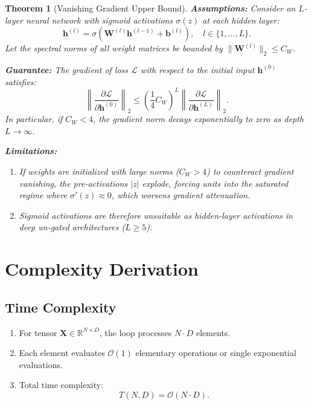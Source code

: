\documentclass[11pt]{article}
\newtheorem{theorem}{Theorem}
\begin{document}
\begin{theorem}[Vanishing Gradient Upper Bound]
\label{thm:vanishing_grad}
\textbf{Assumptions:}
Consider an $L$-layer neural network with sigmoid activations $\sigma(z)$ at each hidden layer:
\begin{equation}
\mathbf{h}^{(l)} = \sigma(\mathbf{W}^{(l)} \mathbf{h}^{(l-1)} + \mathbf{b}^{(l)}), \quad l \in \{1, \dots, L\}.
\end{equation}
Let the spectral norms of all weight matrices be bounded by $\|\mathbf{W}^{(l)}\|_2 \le C_W$.

\textbf{Guarantee:}
The gradient of loss $\mathcal{L}$ with respect to the initial input $\mathbf{h}^{(0)}$ satisfies:
\begin{equation}
\label{eq:vanishing_bound}
\left\| \frac{\partial \mathcal{L}}{\partial \mathbf{h}^{(0)}} \right\|_2 \le \left( \frac{1}{4} C_W \right)^L \left\| \frac{\partial \mathcal{L}}{\partial \mathbf{h}^{(L)}} \right\|_2.
\end{equation}
In particular, if $C_W < 4$, the gradient norm decays exponentially to zero as depth $L \to \infty$.

\textbf{Limitations:}
\begin{enumerate}
    \item If weights are initialized with large norms ($C_W > 4$) to counteract gradient vanishing, the pre-activations $|z|$ explode, forcing units into the saturated regime where $\sigma'(z) \approx 0$, which worsens gradient attenuation.
    \item Sigmoid activations are therefore unsuitable as hidden-layer activations in deep un-gated architectures ($L \ge 5$).
\end{enumerate}
\end{theorem}

\section{Complexity Derivation}
\label{sec:complexity}

\subsection{Time Complexity}
\begin{enumerate}
    \item For tensor $\mathbf{X} \in \mathbb{R}^{N \times D}$, the loop processes $N \cdot D$ elements.
    \item Each element evaluates $\mathcal{O}(1)$ elementary operations or single exponential evaluations.
    \item Total time complexity:
    \begin{equation}
    T(N, D) = \mathcal{O}(N \cdot D).
    \end{equation}
\end{enumerate}
\end{document}
